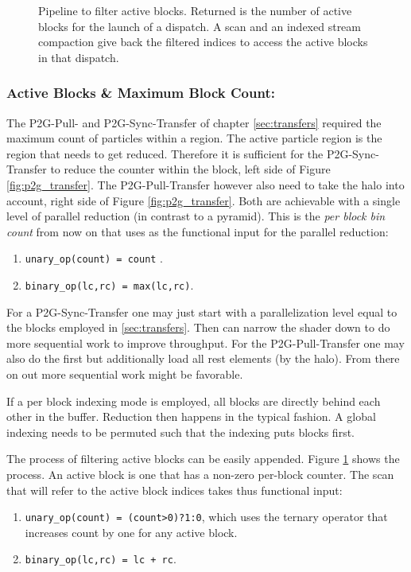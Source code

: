 \documentclass[m,times]{cgMA}
\begin{document}
\begin{figure}[!b]
  
  \caption{Pipeline to filter active blocks. Returned is the number of active blocks for the launch of a dispatch. A scan and an indexed stream compaction give back the filtered indices to access the active blocks in that dispatch.}
  \label{fig:active_block}
\end{figure}

\subsubsection{Active Blocks \& Maximum Block Count:}\label{sec:active_blocks}
The P2G-Pull- and P2G-Sync-Transfer of chapter \ref{sec:transfers} required the maximum count of particles within a region. The active particle region is the region that needs to get reduced. Therefore it is sufficient for the P2G-Sync-Transfer to reduce the counter within the block, left side of Figure \ref{fig:p2g_transfer}. The P2G-Pull-Transfer however also need to take the halo into account, right side of Figure \ref{fig:p2g_transfer}. Both are achievable with a single level of parallel reduction (in contrast to a pyramid). This is the \textit{per block bin count} from now on that uses as the functional input for the parallel reduction:
\begin{enumerate}
  \item \texttt{unary\_op(count) = count} .
  \item \texttt{binary\_op(lc,rc) = max(lc,rc)}.
\end{enumerate}

For a P2G-Sync-Transfer one may just start with a parallelization level equal to the blocks employed in \ref{sec:transfers}. Then can narrow the shader down to do more sequential work to improve throughput. For the P2G-Pull-Transfer one may also do the first but additionally load all rest elements (by the halo). From there on out more sequential work might be favorable.

If a per block indexing mode is employed, all blocks are directly behind each other in the buffer. Reduction then happens in the typical fashion. A global indexing needs to be permuted such that the indexing puts blocks first.

The process of filtering active blocks can be easily appended. Figure \ref{fig:active_block} shows the process. An active block is one that has a non-zero per-block counter. The scan that will refer to the active block indices takes thus functional input:
\begin{enumerate}
  \item \texttt{unary\_op(count) = (count>0)?1:0}, which uses the ternary operator that increases count by one for any active block.
  \item \texttt{binary\_op(lc,rc) = lc + rc}.
\end{enumerate}
\end{document}
